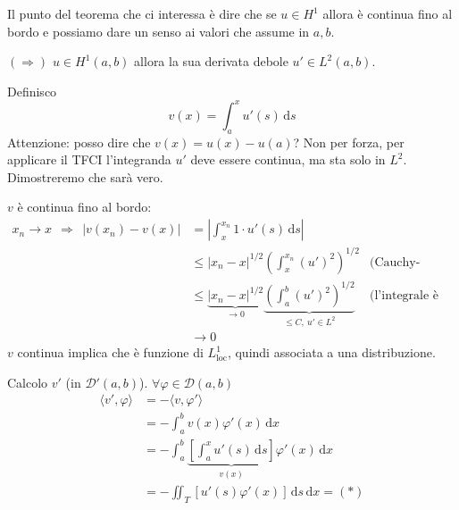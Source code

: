 \documentclass[10pt,a4paper,twoside,openright]{book}
\newcommand{\de}{\,\mathrm d}
\newcommand{\dx}{\de x}
\newcommand{\ds}{\de s}
\begin{document}
Il punto del teorema che ci interessa è dire che se $u\in H^{1}$ allora è continua fino al bordo e possiamo dare un senso ai valori che assume in $a,b$.
\begin{dimostrazione}
    $(\Rightarrow)$ $u\in H^{1}(a,b)$ allora la sua derivata debole $u'\in L^{2}(a,b)$.

    Definisco
    \begin{equation*}
        v(x) =\int ^{x}_{a} u'(s) \ds
    \end{equation*}
    Attenzione: posso dire che $v(x) =u(x) -u(a)$? Non per forza, per applicare il TFCI l'integranda $u'$ deve essere continua, ma sta solo in $L^{2}$. Dimostreremo che sarà vero.

    $v$ è continua fino al bordo:
    \begin{align*}
        x_{n}\rightarrow x\ \ \Rightarrow \ \ | v(x_{n}) -v(x)| & =\left| \int ^{x_{n}}_{x} 1\cdot u'(s) \ds\right|                                                                                          &                                 \\
                                                                & \leqslant | x_{n} -x| ^{1/2}\left(\int ^{x_{n}}_{x}(u')^{2}\right)^{1/2}                                                                   & \text{(Cauchy-Schwarz)}         \\
                                                                & \leqslant \underbrace{| x_{n} -x| ^{1/2}}_{\rightarrow 0}\underbrace{\left(\int ^{b}_{a}(u')^{2}\right)^{1/2}}_{\leqslant C,\ u'\in L^{2}} & \text{(l'integrale è positivo)} \\
                                                                & \rightarrow 0                                                                                                                              &
    \end{align*}
    $v$ continua implica che è funzione di $L^{1}_{\mathrm{loc}}$, quindi associata a una distribuzione.

    Calcolo $v'$ (in $\mathcal{D} '(a,b)$). $\forall \varphi \in \mathcal{D}(a,b)$
    \begin{align*}
        \langle v',\varphi \rangle & =-\langle v,\varphi '\rangle                                                             \\
                                   & =-\int ^{b}_{a} v(x) \varphi '(x) \dx                                                    \\
                                   & =-\int ^{b}_{a}\underbrace{\left[\int ^{x}_{a} u'(s) \ds\right]}_{v(x)} \varphi '(x) \dx \\
                                   & =-\iint _{T}[ u'(s) \varphi '(x)] \ds\dx=(*)
    \end{align*}


\end{dimostrazione}
\end{document}
